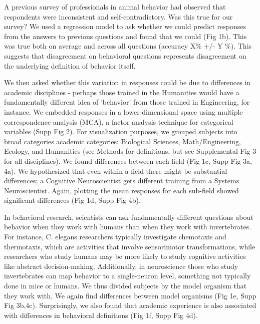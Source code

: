 \documentclass[a4paper, 11pt]{article}
\begin{document}
A previous survey of professionals in animal behavior\cite{levitis2009behavioural} had observed that respondents were inconsistent and self-contradictory. Was this true for our survey? We used a regression model to ask whether we could predict responses from the answers to previous questions and found that we could (Fig 1b). This was true both on average and across all questions (accuracy X\% +/- Y \%). This suggests that disagreement on behavioral questions represents disagreement on the underlying definition of behavior itself.

We then asked whether this variation in responses could be due to differences in academic disciplines - perhaps those trained in the Humanities would have a fundamentally different idea of 'behavior' from those trained in Engineering, for instance. We embedded responses in a lower-dimensional space using multiple correspondence analysis (MCA), a factor analysis technique for categorical variables \cite{le2010multiple} (Supp Fig 2). For visualization purposes, we grouped subjects into broad categories academic categories: Biological Sciences, Math/Engineering, Ecology, and Humanities (see Methods for definitions, but see Supplemental Fig 3 for all disciplines). We found differences between each field (Fig 1c, Supp Fig 3a, 4a). We  hypothesized that even within a field there might be substantial differences; a Cognitive Neuroscientist gets different training from a Systems Neuroscientist. Again, plotting the mean responses for each sub-field showed significant differences (Fig 1d, Supp Fig 4b).

In behavioral research, scientists can ask fundamentally different questions about behavior when they work with humans than when they work with invertebrates. For instance, C. elegans researchers typically investigate chemotaxis and thermotaxis, which are activities that involve sensorimotor transformations, while researchers who study humans may be more likely to study cognitive activities like abstract decision-making. Additionally, in neuroscience those who study invertebrates can map behavior to a single-neuron level, something not typically done in mice or humans.  We thus divided subjects by the model organism that they work with. We again find differences between model organisms (Fig 1e, Supp Fig 3b,4c). Surprisingly, we also found that academic experience is also associated with differences in behavioral definitions (Fig 1f, Supp Fig 4d).
\end{document}
